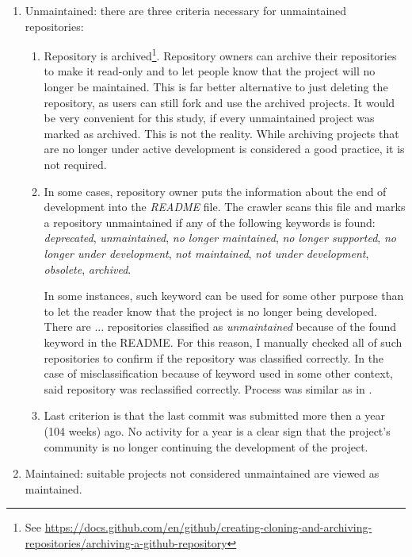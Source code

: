 \begin{enumerate}
\label{sec:(un)maintained}
    \item Unmaintained: there are three criteria necessary for unmaintained repositories:
        \begin{enumerate}
            \item Repository is archived\footnote{See \url{https://docs.github.com/en/github/creating-cloning-and-archiving-repositories/archiving-a-github-repository}}.
            Repository owners can archive their repositories to make it read-only and to let people know that the project will no longer be maintained.
            This is far better alternative to just deleting the repository, as users can still fork and use the archived projects.
            It would be very convenient for this study, if every unmaintained project was marked as archived.
            This is not the reality.
            While archiving projects that are no longer under active development is considered a good practice, it is not required.
            
            \item In some cases, repository owner puts the information about the end of development into the \emph{README} file.
            The crawler scans this file and marks a repository unmaintained if any of the following keywords is found: \emph{deprecated}, \emph{unmaintained}, \emph{no longer maintained}, \emph{no longer supported}, \emph{no longer under development}, \emph{not maintained}, \emph{not under development}, \emph{obsolete}, \emph{archived}.

            In some instances, such keyword can be used for some other purpose than to let the reader know that the project is no longer being developed.
            There are ... repositories classified as \emph{unmaintained} because of the found keyword in the README.
            For this reason, I manually checked all of such repositories to confirm if the repository was classified correctly.
            In the case of misclassification because of keyword used in some other context, said repository was reclassified correctly.
            Process was similar as in \cite{p:8}.

            \item Last criterion is that the last commit was submitted more then a year (104 weeks) ago.
            No activity for a year is a clear sign that the project's community is no longer continuing the development of the project.
        \end{enumerate}

    \item Maintained: suitable projects not considered unmaintained are viewed as maintained.
\end{enumerate}

